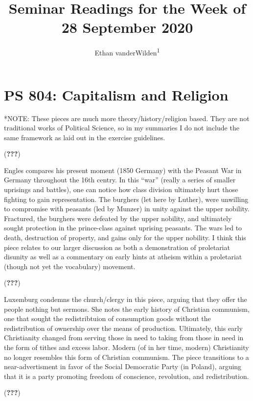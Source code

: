 \documentclass[
  english,
  man]{apa6}
\title{Seminar Readings for the Week of 28 September 2020}
\author{Ethan vanderWilden\textsuperscript{1}}
\date{}
\affiliation{\vspace{0.5cm}\textsuperscript{1} University of Wisconsin-Madison, Department of Political Science}
\begin{document}
\maketitle

\hypertarget{ps-804-capitalism-and-religion}{%
\section{PS 804: Capitalism and Religion}\label{ps-804-capitalism-and-religion}}

*NOTE: These pieces are much more theory/history/religion based. They are not traditional works of Political Science, so in my summaries I do not include the same framework as laid out in the exercise guidelines.

({\textbf{???}})

Engles compares his present moment (1850 Germany) with the Peasant War in Germany throughout the 16th centry. In this \enquote{war} (really a series of smaller uprisings and battles), one can notice how class division ultimately hurt those fighting to gain representation. The burghers (let here by Luther), were unwilling to compromise with peasants (led by Munzer) in unity against the upper nobility. Fractured, the burghers were defeated by the upper nobility, and ultimately sought protection in the prince-class against uprising peasants. The wars led to death, destruction of property, and gains only for the upper nobility. I think this piece relates to our larger discussion as both a demonstration of proletariat disunity as well as a commentary on early hints at atheism within a proletariat (though not yet the vocabulary) movement.

({\textbf{???}})

Luxemburg condemns the church/clergy in this piece, arguing that they offer the people nothing but sermons. She notes the early history of Christian communism, one that sought the redistribtuion of consumption goods without the redistribution of ownership over the means of production. Ultimately, this early Christianity changed from serving those in need to taking from those in need in the form of tithes and excess labor. Modern (of in her time, modern) Christianity no longer resembles this form of Christian communism. The piece transitions to a near-advertisment in favor of the Social Democratic Party (in Poland), arguing that it is a party promoting freedom of conscience, revolution, and redistribution.

({\textbf{???}})
\end{document}
